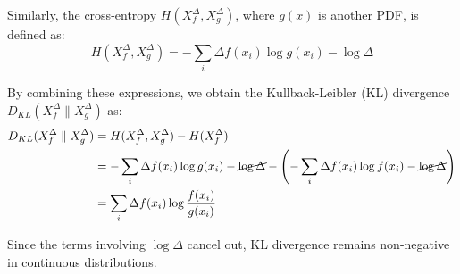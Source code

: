 Similarly, the cross-entropy \(H(X^\Delta_f, X^\Delta_g)\), where \(g(x)\) is another PDF, is defined as:
\[
    H(X^\Delta_f, X^\Delta_g) = - \sum_i \Delta f(x_i) \log g(x_i) - \log \Delta
\]

By combining these expressions, we obtain the Kullback-Leibler (KL) divergence \(D_{KL}(X^\Delta_f \parallel X^\Delta_g)\) as:
\begin{align*}
    D_{KL}(X^\Delta_f \parallel X^\Delta_g) & = H(X^\Delta_f, X^\Delta_g) - H(X^\Delta_f)                                                                                          \\
                                            & = - \sum_i \Delta f(x_i) \log g(x_i) - \cancel{\log \Delta} - \left(- \sum_i \Delta f(x_i) \log f(x_i) - \cancel{\log \Delta}\right) \\
                                            & = \sum_i \Delta f(x_i) \log \frac{f(x_i)}{g(x_i)}
\end{align*}

Since the terms involving \(\log \Delta\) cancel out, KL divergence remains non-negative in continuous distributions.








